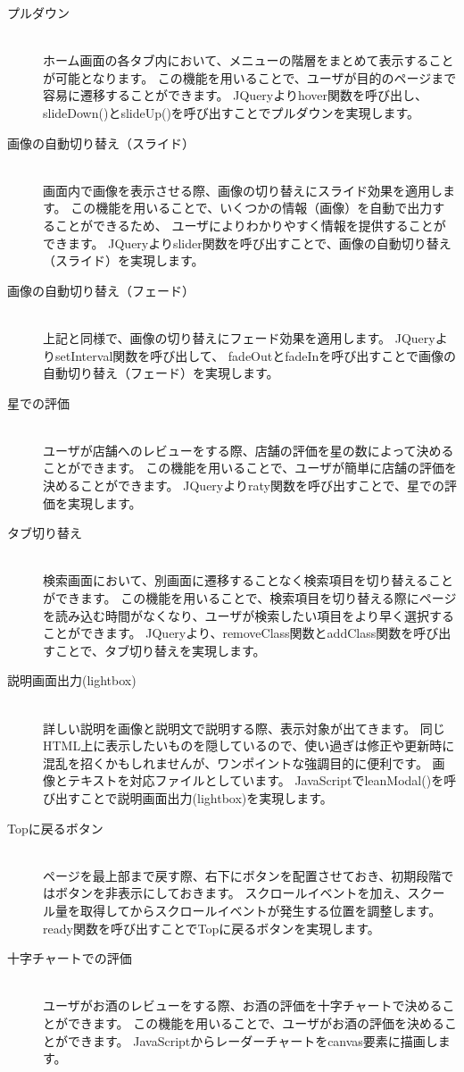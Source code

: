 \documentclass[a4j,titlepage]{jarticle}
\begin{document}
\begin{description}
\item [プルダウン]~\\
ホーム画面の各タブ内において、メニューの階層をまとめて表示することが可能となります。
この機能を用いることで、ユーザが目的のページまで容易に遷移することができます。
JQueryよりhover関数を呼び出し、slideDown()とslideUp()を呼び出すことでプルダウンを実現します。

\item [画像の自動切り替え（スライド）]~\\
画面内で画像を表示させる際、画像の切り替えにスライド効果を適用します。
この機能を用いることで、いくつかの情報（画像）を自動で出力することができるため、
ユーザによりわかりやすく情報を提供することができます。
JQueryよりslider関数を呼び出すことで、画像の自動切り替え（スライド）を実現します。

\item[画像の自動切り替え（フェード）]~\\
上記と同様で、画像の切り替えにフェード効果を適用します。
JQueryよりsetInterval関数を呼び出して、
fadeOutとfadeInを呼び出すことで画像の自動切り替え（フェード）を実現します。

\item[星での評価]~\\
ユーザが店舗へのレビューをする際、店舗の評価を星の数によって決めることができます。
この機能を用いることで、ユーザが簡単に店舗の評価を決めることができます。
JQueryよりraty関数を呼び出すことで、星での評価を実現します。

\item[タブ切り替え]~\\
検索画面において、別画面に遷移することなく検索項目を切り替えることができます。
この機能を用いることで、検索項目を切り替える際にページを読み込む時間がなくなり、ユーザが検索したい項目をより早く選択することができます。
JQueryより、removeClass関数とaddClass関数を呼び出すことで、タブ切り替えを実現します。

\item[説明画面出力(lightbox)]~\\
詳しい説明を画像と説明文で説明する際、表示対象が出てきます。
同じHTML上に表示したいものを隠しているので、使い過ぎは修正や更新時に混乱を招くかもしれませんが、ワンポイントな強調目的に便利です。
画像とテキストを対応ファイルとしています。
JavaScriptでleanModal()を呼び出すことで説明画面出力(lightbox)を実現します。

\item[Topに戻るボタン]~\\
ページを最上部まで戻す際、右下にボタンを配置させておき、初期段階ではボタンを非表示にしておきます。
スクロールイベントを加え、スクール量を取得してからスクロールイベントが発生する位置を調整します。
ready関数を呼び出すことでTopに戻るボタンを実現します。

\item[十字チャートでの評価]~\\
ユーザがお酒のレビューをする際、お酒の評価を十字チャートで決めることができます。
この機能を用いることで、ユーザがお酒の評価を決めることができます。
JavaScriptからレーダーチャートをcanvas要素に描画します。

\end{description}
\end{document}
